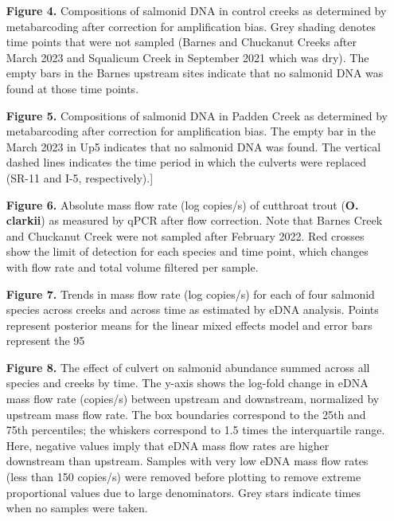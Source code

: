 \documentclass[
]{article}
\begin{document}
\begin{itemize}
\item[\textbf{Figure 4.}] Compositions of salmonid DNA in control creeks as determined by metabarcoding after correction for amplification bias. Grey shading denotes time points that were not sampled (Barnes and Chuckanut Creeks after March 2023 and Squalicum Creek in September 2021 which was dry). The empty bars in the Barnes upstream sites indicate that no salmonid DNA was found at those time points.
\item[\textbf{Figure 5.}] Compositions of salmonid DNA in Padden Creek as determined by metabarcoding after correction for amplification bias. The empty bar in the March 2023 in Up5 indicates that no salmonid DNA was found. The vertical dashed lines indicates the time period in which the culverts were replaced (SR-11 and I-5, respectively).]
\item[\textbf{Figure 6.}] Absolute mass flow rate (log copies/s) of cutthroat trout (\textbf{O. clarkii}) as measured by qPCR after flow correction. Note that Barnes Creek and Chuckanut Creek were not sampled after February 2022. Red crosses show the limit of detection for each species and time point, which changes with flow rate and total volume filtered per sample.
\item[\textbf{Figure 7.}] Trends in mass flow rate (log copies/s) for each of four salmonid species across creeks and across time as estimated by eDNA analysis. Points represent posterior means for the linear mixed effects model and error bars represent the 95%
\item[\textbf{Figure 8.}] The effect of culvert on salmonid abundance summed across all species and creeks by time. The y-axis shows the log-fold change in eDNA mass flow rate (copies/s) between upstream and downstream, normalized by upstream mass flow rate. The box boundaries correspond to the 25th and 75th percentiles; the whiskers correspond to 1.5 times the interquartile range. Here, negative values imply that eDNA mass flow rates are higher downstream than upstream. Samples with very low eDNA mass flow rates (less than 150 copies/s) were removed before plotting to remove extreme proportional values due to large denominators. Grey stars indicate times when no samples were taken.

\end{itemize}
\end{document}
